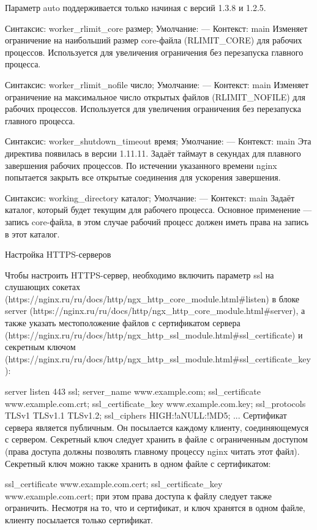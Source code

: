 \documentclass[a4paper,10pt,twoside]{article}
\begin{document}
\begin{itemize}
Параметр auto поддерживается только начиная с версий 1.3.8 и 1.2.5.

Синтаксис:	worker_rlimit_core размер;
Умолчание:	—
Контекст:	main
Изменяет ограничение на наибольший размер core-файла (RLIMIT_CORE) для рабочих процессов. Используется для увеличения ограничения без перезапуска главного процесса.

Синтаксис:	worker_rlimit_nofile число;
Умолчание:	—
Контекст:	main
Изменяет ограничение на максимальное число открытых файлов (RLIMIT_NOFILE) для рабочих процессов. Используется для увеличения ограничения без перезапуска главного процесса.

Синтаксис:	worker_shutdown_timeout время;
Умолчание:	—
Контекст:	main
Эта директива появилась в версии 1.11.11.
Задаёт таймаут в секундах для плавного завершения рабочих процессов. По истечении указанного времени nginx попытается закрыть все открытые соединения для ускорения завершения.

Синтаксис:	working_directory каталог;
Умолчание:	—
Контекст:	main
Задаёт каталог, который будет текущим для рабочего процесса. Основное применение — запись core-файла, в этом случае рабочий процесс должен иметь права на запись в этот каталог.
\end{itemize}

Настройка HTTPS-серверов

Чтобы настроить HTTPS-сервер, необходимо включить параметр ssl на слушающих сокетах (https://nginx.ru/ru/docs/http/ngx_http_core_module.html#listen)  в блоке server (https://nginx.ru/ru/docs/http/ngx_http_core_module.html#server), а также указать местоположение файлов с сертификатом сервера (https://nginx.ru/ru/docs/http/ngx_http_ssl_module.html#ssl_certificate) и секретным ключом (https://nginx.ru/ru/docs/http/ngx_http_ssl_module.html#ssl_certificate_key):

server {
    listen              443 ssl;
    server_name         www.example.com;
    ssl_certificate     www.example.com.crt;
    ssl_certificate_key www.example.com.key;
    ssl_protocols       TLSv1 TLSv1.1 TLSv1.2;
    ssl_ciphers         HIGH:!aNULL:!MD5;
    ...
}
Сертификат сервера является публичным. Он посылается каждому клиенту, соединяющемуся с сервером. Секретный ключ следует хранить в файле с ограниченным доступом (права доступа должны позволять главному процессу nginx читать этот файл). Секретный ключ можно также хранить в одном файле с сертификатом:

    ssl_certificate     www.example.com.cert;
    ssl_certificate_key www.example.com.cert;
при этом права доступа к файлу следует также ограничить. Несмотря на то, что и сертификат, и ключ хранятся в одном файле, клиенту посылается только сертификат.
\end{document}
